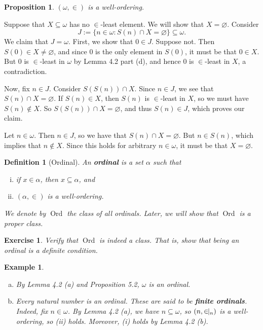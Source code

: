 \documentclass[10pt]{article}
\makeatletter
\DeclareMathOperator{\Ord}{Ord}
\theoremstyle{newstyle}
\newtheorem{prop}[thm]{Proposition}
\newtheorem{defn}[thm]{Definition}
\newtheorem{exercise}[thm]{Exercise}
\newtheorem{exmp}[thm]{Example}
\newenvironment{pf}[1][\proofname]{\par
  \pushQED{\qed}%
  \normalfont \topsep0\p@\relax
  \trivlist
  \item[\hskip\labelsep\scshape
  #1\@addpunct{.}]\ignorespaces
}{%
  \popQED\endtrivlist\@endpefalse
}
\makeatother
\begin{document}
\begin{prop}
$(\omega, \in)$ is a well-ordering.
\end{prop}
\begin{pf}
Suppose that $X \subseteq \omega$ has no $\in$-least element. We will show that $X = \varnothing$. 
Consider 
\[ J := \{n \in \omega : S(n) \cap X = \varnothing\} \subseteq \omega. \] 
We claim that $J = \omega$. First, we show that $0 \in J$. Suppose not. Then 
$S(0) \in X \neq \varnothing$, and since $0$ is the only element in $S(0)$, it must be that 
$0 \in X$. But $0$ is $\in$-least in $\omega$ by Lemma 4.2 part (d), and hence 
$0$ is $\in$-least in $X$, a contradiction. 

Now, fix $n \in J$. Consider $S(S(n)) \cap X$. Since $n \in J$, we see that $S(n) \cap X = \varnothing$. 
If $S(n) \in X$, then $S(n)$ is $\in$-least in $X$, so we must have $S(n) \notin X$. 
So $S(S(n)) \cap X = \varnothing$, and thus $S(n) \in J$, which proves our claim. 

Let $n \in \omega$. Then $n \in J$, so we have that $S(n) \cap X = \varnothing$. But 
$n \in S(n)$, which implies that $n \notin X$. Since this holds for arbitrary $n \in \omega$, 
it must be that $X = \varnothing$. 
\end{pf}

\begin{defn}[Ordinal]
An {\bf ordinal} is a set $\alpha$ such that 
\begin{enumerate}[(i)]
    \item if $x \in \alpha$, then $x \subseteq \alpha$, and 
    \item $(\alpha, \in)$ is a well-ordering.
\end{enumerate} 
We denote by $\Ord$ the class of all ordinals. Later, we will show that $\Ord$ is a proper class.
\end{defn} 

\begin{exercise}
Verify that $\Ord$ is indeed a class. That is, show that being an ordinal is a definite condition.
\end{exercise}

\begin{exmp}~ 
\begin{enumerate}[(a)]
    \item By Lemma 4.2 (a) and Proposition 5.2, $\omega$ is an ordinal.
    \item Every natural number is an ordinal. These are said to be {\bf finite ordinals}. Indeed, fix
    $n \in \omega$. By Lemma 4.2 (a), 
    we have $n \subseteq \omega$, so $(n, \in\hspace{-0.85ex}|_n)$ is a well-ordering, so (ii) holds. 
    Moreover, (i) holds by Lemma 4.2 (b). 
\end{enumerate} 
\end{exmp}
\end{document}
